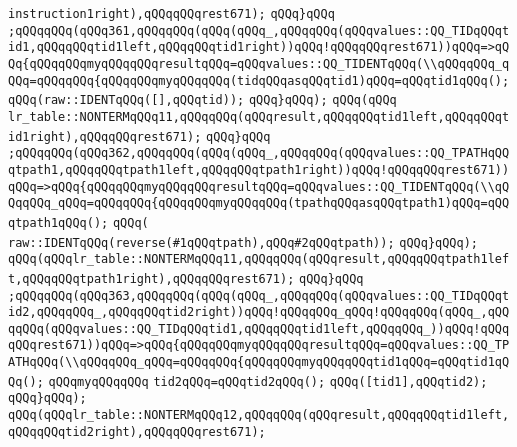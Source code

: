 \verb|instruction1right),qQQqqQQqrest671);|\newline
\verb|qQQq}qQQq|\newline
\verb|;qQQqqQQq(qQQq361,qQQqqQQq(qQQq(qQQq_,qQQqqQQq(qQQqvalues::QQ_TIDqQQqtid1,qQQqqQQqtid1left,qQQqqQQqtid1right))qQQq!qQQqqQQqrest671))qQQq=>qQQq{qQQqqQQqmyqQQqqQQqresultqQQq=qQQqvalues::QQ_TIDENTqQQq(\\qQQqqQQq_qQQq=qQQqqQQq{qQQqqQQqmyqQQqqQQq(tidqQQqasqQQqtid1)qQQq=qQQqtid1qQQq();|\newline
\verb|qQQq(raw::IDENTqQQq([],qQQqtid));|\newline
\verb|qQQq}qQQq);|\newline
\verb|qQQq(qQQq|\newline
\verb|lr_table::NONTERMqQQq11,qQQqqQQq(qQQqresult,qQQqqQQqtid1left,qQQqqQQqtid1right),qQQqqQQqrest671);|\newline
\verb|qQQq}qQQq|\newline
\verb|;qQQqqQQq(qQQq362,qQQqqQQq(qQQq(qQQq_,qQQqqQQq(qQQqvalues::QQ_TPATHqQQqtpath1,qQQqqQQqtpath1left,qQQqqQQqtpath1right))qQQq!qQQqqQQqrest671))qQQq=>qQQq{qQQqqQQqmyqQQqqQQqresultqQQq=qQQqvalues::QQ_TIDENTqQQq(\\qQQqqQQq_qQQq=qQQqqQQq{qQQqqQQqmyqQQqqQQq(tpathqQQqasqQQqtpath1)qQQq=qQQqtpath1qQQq();|\newline
\verb|qQQq(|\newline
\verb|raw::IDENTqQQq(reverse(#1qQQqtpath),qQQq#2qQQqtpath));|\newline
\verb|qQQq}qQQq);|\newline
\verb|qQQq(qQQqlr_table::NONTERMqQQq11,qQQqqQQq(qQQqresult,qQQqqQQqtpath1left,qQQqqQQqtpath1right),qQQqqQQqrest671);|\newline
\verb|qQQq}qQQq|\newline
\verb|;qQQqqQQq(qQQq363,qQQqqQQq(qQQq(qQQq_,qQQqqQQq(qQQqvalues::QQ_TIDqQQqtid2,qQQqqQQq_,qQQqqQQqtid2right))qQQq!qQQqqQQq_qQQq!qQQqqQQq(qQQq_,qQQqqQQq(qQQqvalues::QQ_TIDqQQqtid1,qQQqqQQqtid1left,qQQqqQQq_))qQQq!qQQqqQQqrest671))qQQq=>qQQq{qQQqqQQqmyqQQqqQQqresultqQQq=qQQqvalues::QQ_TPATHqQQq(\\qQQqqQQq_qQQq=qQQqqQQq{qQQqqQQqmyqQQqqQQqtid1qQQq=qQQqtid1qQQq();|\newline
\verb|qQQqmyqQQqqQQq|\newline
\verb|tid2qQQq=qQQqtid2qQQq();|\newline
\verb|qQQq([tid1],qQQqtid2);|\newline
\verb|qQQq}qQQq);|\newline
\verb|qQQq(qQQqlr_table::NONTERMqQQq12,qQQqqQQq(qQQqresult,qQQqqQQqtid1left,qQQqqQQqtid2right),qQQqqQQqrest671);|\newline

